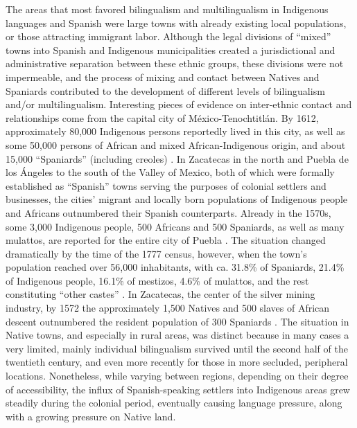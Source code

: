 \documentclass[output=paper,hidelinks]{langscibook}
\begin{document}
\hspace*{-1mm}The areas that most favored bilingualism and multilingualism in Indigenous languages and Spanish were large towns with already existing local populations, or those attracting immigrant labor. Although the legal divisions of ``mixed'' towns into Spanish and Indigenous municipalities created a jurisdictional and administrative separation between these ethnic groups, these divisions were not impermeable, and the process of mixing and contact between Natives and Spaniards contributed to the development of different levels of bilingualism and/or multilingualism. Interesting pieces of evidence on inter-ethnic contact and relationships come from the capital city of México-Tenochtitlán. By 1612, approximately 80,000 Indigenous persons reportedly lived in this city, as well as some 50,000 persons of African and mixed African-Indigenous origin, and about 15,000 ``Spaniards'' (including creoles) \citep[34]{nutiniisaac2009}. In Zacatecas in the north and Puebla de los Ángeles to the south of the Valley of Mexico, both of which were formally established as ``Spanish'' towns serving the purposes of colonial settlers and businesses, the cities’ migrant and locally born populations of Indigenous people and Africans outnumbered their Spanish counterparts. Already in the 1570s, some 3,000 Indigenous people, 500 Africans and 500 Spaniards, as well as many mulattos, are reported for the entire city of Puebla \citep[34--36]{nutiniisaac2009}. The situation changed dramatically by the time of the 1777 census, however, when the town’s population reached over 56,000 inhabitants, with ca. 31.8\% of Spaniards, 21.4\% of Indigenous people, 16.1\% of mestizos, 4.6\% of mulattos, and the rest constituting “other castes” \citep[48]{nutiniisaac2009}. In Zacatecas, the center of the silver mining industry, by 1572 the approximately 1,500 Natives and 500 slaves of African descent outnumbered the resident population of 300 Spaniards \citep[109--117]{velascomurillo2012}. The situation in Native towns, and especially in rural areas, was distinct because in many cases a very limited, mainly individual bilingualism survived until the second half of the twentieth century, and even more recently for those in more secluded, peripheral locations. Nonetheless, while varying between regions, depending on their degree of accessibility, the influx of Spanish-speaking settlers into Indigenous areas grew steadily during the colonial period, eventually causing language pressure, along with a growing pressure on Native land.
\end{document}
